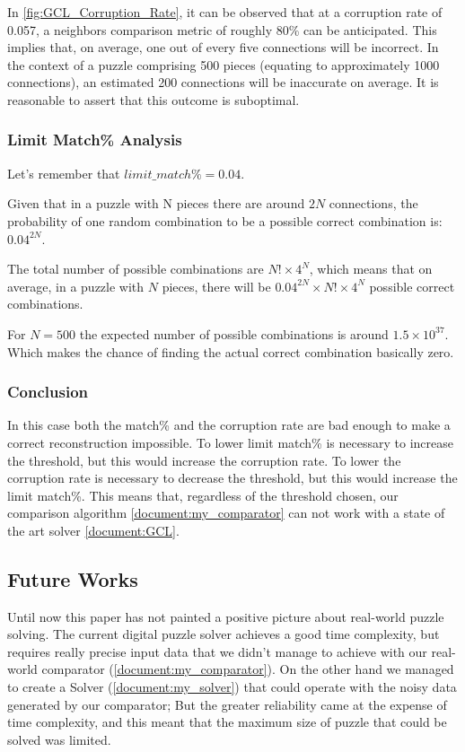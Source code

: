 \documentclass{article}
\begin{document}
In \cref{fig:GCL_Corruption_Rate}, it can be observed that at a corruption rate of 0.057,
a neighbors comparison metric of roughly 80\% can be anticipated.
This implies that, on average, one out of every five connections will be incorrect.
In the context of a puzzle comprising 500 pieces (equating to approximately 1000 connections),
an estimated 200 connections will be inaccurate on average.
It is reasonable to assert that this outcome is suboptimal.

\subsubsection{Limit Match\% Analysis}
Let's remember that \(limit\_match\% = 0.04\).

Given that in a puzzle with N pieces there are around \(2N \) connections,
the probability of one random combination to be a
possible correct combination is: \(0.04^{2N}\).

The total number of possible combinations are \(N! \times 4^N\),
which means that on average, in a puzzle with \(N\) pieces,
there will be \(0.04^{2N} \times N! \times 4^N \)
possible correct combinations.

For \( N = 500 \) the expected number of possible combinations is around \( 1.5 \times 10^{37} \).
Which makes the chance of finding the actual correct combination basically zero.
\subsubsection{Conclusion}
In this case both the match\% and the corruption rate are bad enough to make a correct reconstruction impossible.
To lower limit match\% is necessary to increase the threshold, but this would increase the corruption rate.
To lower the corruption rate is necessary to decrease the threshold, but this would increase the limit match\%.
This means that, regardless of the threshold chosen, our comparison algorithm \cref{document:my_comparator}
can not work with a state of the art solver \cref{document:GCL}.


\subsection{Future Works}

Until now this paper has not painted a positive picture about real-world
puzzle solving. The current digital puzzle solver achieves a good time
complexity, but requires really precise input data that we didn't manage
to achieve with our real-world comparator (\cref{document:my_comparator}).
On the other hand we managed to create a Solver (\cref{document:my_solver})
that could operate with the noisy data generated by our comparator;
But the greater reliability came at the expense of time complexity,
and this meant that the maximum size of puzzle that could be solved was limited.
\end{document}
